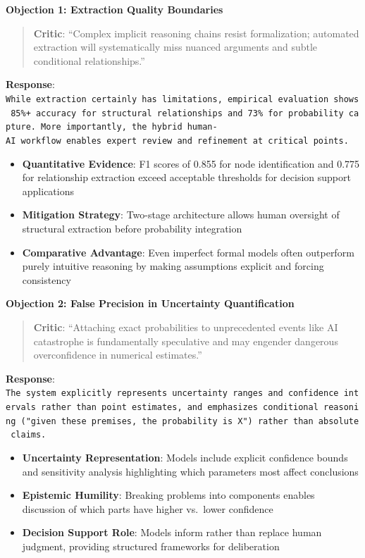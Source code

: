 \documentclass[
  11pt,
  letterpaper,
]{book}
\providecommand{\tightlist}{%
  \setlength{\itemsep}{0pt}\setlength{\parskip}{0pt}}
\begin{document}
\textbf{Objection 1: Extraction Quality Boundaries}

\begin{quote}
\textbf{Critic}: ``Complex implicit reasoning chains resist
formalization; automated extraction will systematically miss nuanced
arguments and subtle conditional relationships.''
\end{quote}

\textbf{Response}:
\texttt{While\ extraction\ certainly\ has\ limitations,\ empirical\ evaluation\ shows\ 85\%+\ accuracy\ for\ structural\ relationships\ and\ 73\%\ for\ probability\ capture.\ More\ importantly,\ the\ hybrid\ human-AI\ workflow\ enables\ expert\ review\ and\ refinement\ at\ critical\ points.}

\begin{itemize}
\tightlist
\item
  \textbf{Quantitative Evidence}: F1 scores of 0.855 for node
  identification and 0.775 for relationship extraction exceed acceptable
  thresholds for decision support applications
\item
  \textbf{Mitigation Strategy}: Two-stage architecture allows human
  oversight of structural extraction before probability integration
\item
  \textbf{Comparative Advantage}: Even imperfect formal models often
  outperform purely intuitive reasoning by making assumptions explicit
  and forcing consistency
\end{itemize}

\textbf{Objection 2: False Precision in Uncertainty Quantification}

\begin{quote}
\textbf{Critic}: ``Attaching exact probabilities to unprecedented events
like AI catastrophe is fundamentally speculative and may engender
dangerous overconfidence in numerical estimates.''
\end{quote}

\textbf{Response}:
\texttt{The\ system\ explicitly\ represents\ uncertainty\ ranges\ and\ confidence\ intervals\ rather\ than\ point\ estimates,\ and\ emphasizes\ conditional\ reasoning\ ("given\ these\ premises,\ the\ probability\ is\ X")\ rather\ than\ absolute\ claims.}

\begin{itemize}
\tightlist
\item
  \textbf{Uncertainty Representation}: Models include explicit
  confidence bounds and sensitivity analysis highlighting which
  parameters most affect conclusions
\item
  \textbf{Epistemic Humility}: Breaking problems into components enables
  discussion of which parts have higher vs.~lower confidence
\item
  \textbf{Decision Support Role}: Models inform rather than replace
  human judgment, providing structured frameworks for deliberation
\end{itemize}
\end{document}
